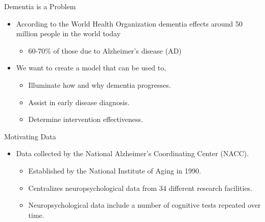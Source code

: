 \documentclass[
  ignorenonframetext,
]{beamer}
\providecommand{\tightlist}{%
  \setlength{\itemsep}{0pt}\setlength{\parskip}{0pt}}
\begin{document}
\begin{frame}{Dementia is a Problem}
\protect\hypertarget{dementia-is-a-problem}{}
\begin{itemize}
\tightlist
\item
  According to the World Health Organization dementia effects around 50
  million people in the world today

  \begin{itemize}
  \tightlist
  \item
    60-70\% of those due to Alzheimer's disease (AD)
  \end{itemize}
\item
  We want to create a model that can be used to,

  \begin{itemize}
  \tightlist
  \item
    Illuminate how and why dementia progresses.
  \item
    Assist in early disease diagnosis.
  \item
    Determine intervention effectiveness.
  \end{itemize}
\end{itemize}
\end{frame}

\begin{frame}{Motivating Data}
\protect\hypertarget{motivating-data}{}
\begin{itemize}
\tightlist
\item
  Data collected by the National Alzheimer's Coordinating Center (NACC).

  \begin{itemize}
  \tightlist
  \item
    Established by the National Institute of Aging in 1990.
  \item
    Centralizes neuropsychological data from 34 different research
    facilities.
  \item
    Neuropsychological data include a number of cognitive tests repeated
    over time.
  \end{itemize}
\end{itemize}
\end{frame}
\end{document}
